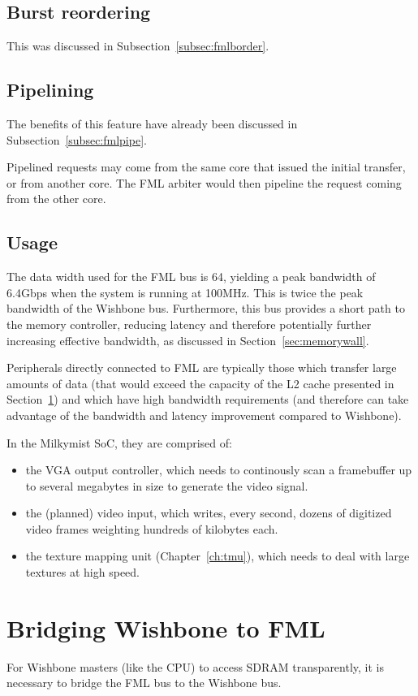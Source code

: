\documentclass[a4paper,11pt]{kthesis}
\begin{document}
\subsection{Burst reordering}
This was discussed in Subsection~\ref{subsec:fmlborder}.

\subsection{Pipelining}
The benefits of this feature have already been discussed in Subsection~\ref{subsec:fmlpipe}.

Pipelined requests may come from the same core that issued the initial transfer, or from another core. The FML arbiter would then pipeline the request coming from the other core.

\subsection{Usage}
The data width used for the FML bus is 64, yielding a peak bandwidth of 6.4Gbps when the system is running at 100MHz. This is twice the peak bandwidth of the Wishbone bus. Furthermore, this bus provides a short path to the memory controller, reducing latency and therefore potentially further increasing effective bandwidth, as discussed in Section~\ref{sec:memorywall}.

Peripherals directly connected to FML are typically those which transfer large amounts of data (that would exceed the capacity of the L2 cache presented in Section~\ref{sec:fmlbrg}) and which have high bandwidth requirements (and therefore can take advantage of the bandwidth and latency improvement compared to Wishbone).

In the Milkymist SoC, they are comprised of:
\begin{itemize}
\item the VGA output controller, which needs to continously scan a framebuffer up to several megabytes in size to generate the video signal.
\item the (planned) video input, which writes, every second, dozens of digitized video frames weighting hundreds of kilobytes each.
\item the texture mapping unit (Chapter~\ref{ch:tmu}), which needs to deal with large textures at high speed.
\end{itemize}

\section{Bridging Wishbone to FML}
\label{sec:fmlbrg}
For Wishbone masters (like the CPU) to access SDRAM transparently, it is necessary to bridge the FML bus to the Wishbone bus.
\end{document}
